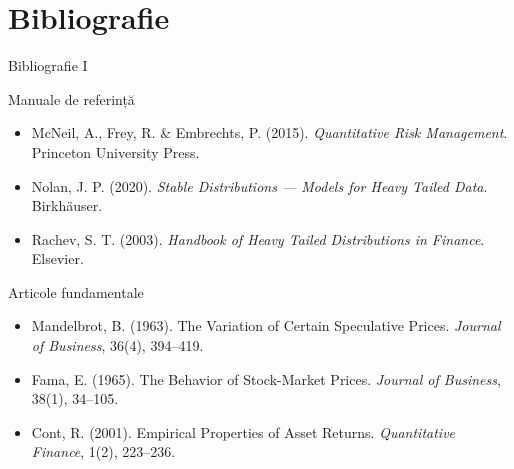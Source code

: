 \documentclass[9pt, aspectratio=169, t]{beamer}
\theoremstyle{definition}
\newenvironment{cminipage}[1]{%
    \par\noindent\hfill\begin{minipage}{#1}\ignorespaces
}{%
    \end{minipage}\hfill\null\par
}
\begin{document}
\section{Bibliografie}

\begin{frame}{Bibliografie I}
    \begin{cminipage}{0.95\textwidth}
    \begin{block}{Manuale de referință}
        {\small
        \begin{itemize}\setlength{\itemsep}{0pt}
            \item McNeil, A., Frey, R. \& Embrechts, P. (2015). \textit{Quantitative Risk Management}. Princeton University Press.
            \item Nolan, J. P. (2020). \textit{Stable Distributions --- Models for Heavy Tailed Data}. Birkh\"{a}user.
            \item Rachev, S. T. (2003). \textit{Handbook of Heavy Tailed Distributions in Finance}. Elsevier.
        \end{itemize}
        }
    \end{block}

    \begin{exampleblock}{Articole fundamentale}
        {\small
        \begin{itemize}\setlength{\itemsep}{0pt}
            \item Mandelbrot, B. (1963). The Variation of Certain Speculative Prices. \textit{Journal of Business}, 36(4), 394--419.
            \item Fama, E. (1965). The Behavior of Stock-Market Prices. \textit{Journal of Business}, 38(1), 34--105.
            \item Cont, R. (2001). Empirical Properties of Asset Returns. \textit{Quantitative Finance}, 1(2), 223--236.
        \end{itemize}
        }
    \end{exampleblock}
    \end{cminipage}
\end{frame}
\end{document}
